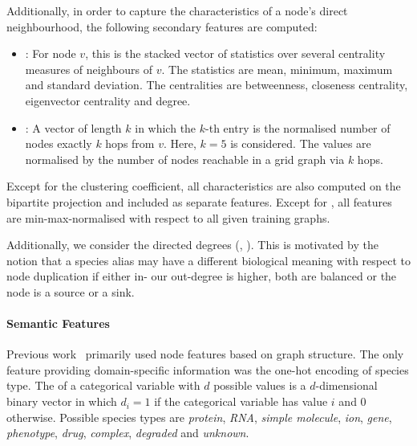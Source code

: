 \documentclass[
	fontsize=10pt, %
	twoside=true, %
	secnumdepth=1, %
  toc=indentunnumbered %
]{kaobook}
\begin{document}
Additionally, in order to capture the characteristics of a node's direct
neighbourhood, the following secondary features are computed:
\begin{itemize}
\item {}: For node $v$, this is the stacked
  vector of statistics over several centrality measures of neighbours of $v$.
  The statistics are mean, minimum, maximum and standard deviation. The
  centralities are betweenness, closeness centrality, eigenvector centrality and degree.
\item {}: A vector of length $k$ in which the $k$-th
  entry is the normalised number of nodes exactly $k$ hops from $v$. Here, $k=5$
  is considered. The values are normalised by the number of nodes reachable in a
  grid graph via $k$ hops.
\end{itemize}

Except for the clustering coefficient, all characteristics are also
computed on the bipartite projection and included as separate features.
Except for , all features are min-max-normalised
with respect to all given training graphs.


Additionally, we consider the directed degrees (,
). This is motivated by the notion that a species alias may
have a different biological meaning with respect to node duplication if either in- our
out-degree is higher, both are balanced or the node is a source or a sink.




\paragraph{Semantic Features}

Previous work~\cite{nielsen_MachineLearningSupport_2019} primarily used node
features based on graph structure. The only feature providing domain-specific
information was the one-hot encoding of species type. The 
of a categorical variable with $d$ possible values is a $d$-dimensional binary
vector in which $d_i = 1$ if the categorical variable has value $i$ and $0$
otherwise. Possible species types are \textit{protein}, \textit{RNA},
\textit{simple molecule}, \textit{ion}, \textit{gene}, \textit{phenotype},
\textit{drug}, \textit{complex}, \textit{degraded} and \textit{unknown}.
\end{document}
